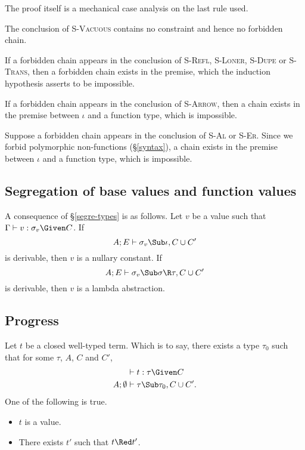 \documentclass{amsart}
\theoremstyle{definition}
\begin{document}
The proof itself is a mechanical case analysis on the last rule
used.

The conclusion of \textsc{S-Vacuous} contains no constraint and
hence no forbidden chain.

If a forbidden chain appears in the conclusion of \textsc{S-Refl},
\textsc{S-Loner}, \textsc{S-Dupe} or \textsc{S-Trans}, then a
forbidden chain exists in the premise, which the induction
hypothesis asserts to be impossible.

If a forbidden chain appears
in the conclusion of \textsc{S-Arrow}, then a chain exists in the
premise between $\iota$ and a function type, which is impossible.

Suppose a forbidden chain appears in the conclusion of
\textsc{S-Al} or \textsc{S-Er}. Since we forbid polymorphic
non-functions (\S\ref{syntax}), a chain exists in the premise
between $\iota$ and a function type, which is impossible.

\subsection{Segregation of base values and function values}
\label{segre-values}
A consequence of \S\ref{segre-types} is as follows. Let $v$ be a
value such that $\Gamma\vdash v:\sigma_v\Given C$. If
\[
A;E\vdash \sigma_v\Sub\iota,C\cup C'
\]
is derivable, then $v$ is a nullary constant. If
\[
A;E\vdash \sigma_v\Sub\sigma\R\tau,C\cup C'
\]
is derivable, then $v$ is a lambda abstraction.

\subsection{Progress} Let $t$ be a closed well-typed term. Which
is to say, there exists a type $\tau_0$ such that for some
$\tau$, $A$, $C$ and $C'$,
\begin{align*}
&\vdash t:\tau\Given C\\
A;\emptyset&\vdash \tau\Sub\tau_0,C\cup C'.
\end{align*}
One of the following is true.
\begin{itemize}
\item $t$ is a value.
\item There exists $t'$ such that $t\Red t'$.
\end{itemize}
\end{document}
